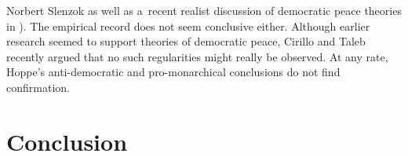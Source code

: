 \begin{artengenv}{Norbert Slenzok}
{%
 \parencite*[][pp.232–237]{hoppe_great_2021} as well as a~recent realist discussion of democratic peace theories in
 \parencite*{mearsheimer_great_2018}).
 The empirical record does not seem conclusive either. Although earlier research
 \parencites{pinker_better_2012}{rummel_libertarianism_1983}
 seemed to support theories of democratic peace, Cirillo and Taleb recently
 \parencite*{cirillo_statistical_2015}
 argued that no such regularities might really be observed. At any rate, Hoppe's anti-democratic and pro-monarchical conclusions do not find confirmation.}



\section{Conclusion}


\end{artengenv}
